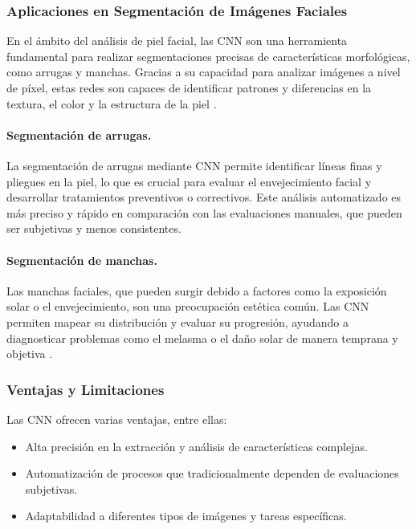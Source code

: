 \subsubsection{Aplicaciones en Segmentación de Imágenes Faciales}  
En el ámbito del análisis de piel facial, las CNN son una herramienta fundamental para realizar segmentaciones precisas de características morfológicas, como arrugas y manchas. Gracias a su capacidad para analizar imágenes a nivel de píxel, estas redes son capaces de identificar patrones y diferencias en la textura, el color y la estructura de la piel \parencite{autor2021deeplab}.

\paragraph{Segmentación de arrugas.}  
La segmentación de arrugas mediante CNN permite identificar líneas finas y pliegues en la piel, lo que es crucial para evaluar el envejecimiento facial y desarrollar tratamientos preventivos o correctivos. Este análisis automatizado es más preciso y rápido en comparación con las evaluaciones manuales, que pueden ser subjetivas y menos consistentes.


\paragraph{Segmentación de manchas.}  
Las manchas faciales, que pueden surgir debido a factores como la exposición solar o el envejecimiento, son una preocupación estética común. Las CNN permiten mapear su distribución y evaluar su progresión, ayudando a diagnosticar problemas como el melasma o el daño solar de manera temprana y objetiva \parencite{autor2020segmentacion}.

\subsubsection{Ventajas y Limitaciones}  
Las CNN ofrecen varias ventajas, entre ellas:
\begin{itemize}
    \item Alta precisión en la extracción y análisis de características complejas.
    \item Automatización de procesos que tradicionalmente dependen de evaluaciones subjetivas.
    \item Adaptabilidad a diferentes tipos de imágenes y tareas específicas.
\end{itemize}

